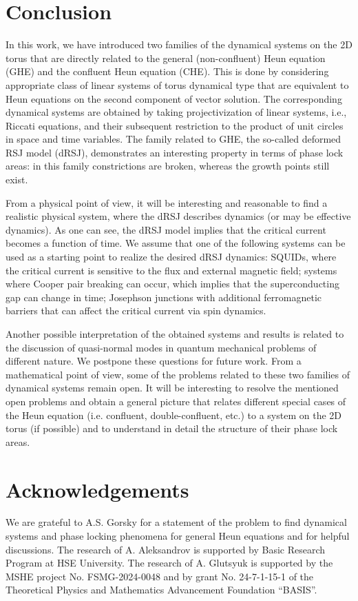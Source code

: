 \documentclass[preprint,12pt]{elsarticle}
\theoremstyle{plain}
\numberwithin{equation}{section}
\numberwithin{equation}{section}
\begin{document}
\section{Conclusion}

In this work, we have introduced two families of the dynamical systems on the 2D torus that are directly related to the general (non-confluent) Heun equation (GHE) and the confluent Heun equation (CHE). This is done by considering appropriate class of linear systems of torus dynamical type that are equivalent to Heun equations on the second component of vector solution. The corresponding dynamical systems are obtained by taking projectivization of linear systems, i.e., Riccati equations,  and their subsequent restriction to the product of unit circles in space and time variables. The family related to GHE, the so-called deformed RSJ model (dRSJ), demonstrates an interesting property in terms of phase lock areas: in this family constrictions are broken, whereas the growth points still exist.

From a physical point of view, it will be interesting and reasonable to find a realistic physical system, where the dRSJ describes dynamics (or may be effective dynamics). As one can see, the dRSJ model implies that the critical current becomes a function of time. We assume that one of the following systems can be used as a starting point to realize the desired dRSJ dynamics: SQUIDs, where the critical current is sensitive to the flux and external magnetic field; systems where Cooper pair breaking can occur, which implies that the superconducting gap can change in time; Josephson junctions with additional ferromagnetic barriers that can affect the critical current via spin dynamics.

Another possible interpretation of the obtained systems and results is related to the discussion of quasi-normal modes in quantum mechanical problems of different nature. We postpone these questions for future work. From a mathematical point of view, some of the problems related to these two families of dynamical systems remain open. It will be interesting to resolve the mentioned open problems and obtain a general picture that relates different special cases of the Heun equation (i.e. confluent, double-confluent, etc.) to a system on the 2D torus (if possible) and to understand in detail the structure of their phase lock areas. 

\section*{Acknowledgements}

We are grateful to A.S. Gorsky for a statement of the problem to find dynamical systems and phase locking phenomena for general Heun equations and for helpful discussions. The research of A. Aleksandrov is supported by Basic Research Program at HSE University. The research of A. Glutsyuk is supported by the MSHE project No. FSMG-2024-0048 and by grant No. 24-7-1-15-1 of the Theoretical Physics and Mathematics Advancement Foundation ``BASIS''.



\end{document}
